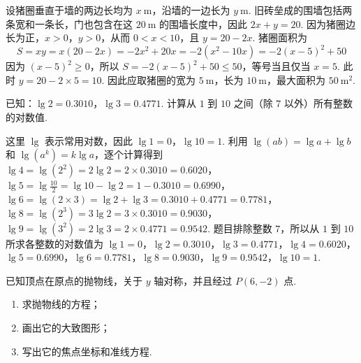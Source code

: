 \begin{solution}
设猪圈垂直于墙的两边长均为 \(x\mathrm{~m}\)，沿墙的一边长为 \(y\mathrm{~m}\). 旧砖垒成的围墙包括两条宽和一条长，门也包含在这 \(20\mathrm{~m}\) 的围墙长度中，因此
\(2x+y=20\). 因为猪圈边长为正，\(x>0\)，\(y>0\)，从而 \(0<x<10\)，且 \(y=20-2x\). 猪圈面积为
\[
S=xy=x(20-2x)=-2x^2+20x=-2\left(x^2-10x\right)
=-2\left(x-5\right)^2+50
\]
因为 \(\left(x-5\right)^2\geqslant0\)，所以 \(S=-2\left(x-5\right)^2+50\leq50\)，等号当且仅当 \(x=5\). 此时
\(y=20-2\times5=10\). 因此应取猪圈的宽为 \(5\mathrm{~m}\)，长为 \(10\mathrm{~m}\)，最大面积为 \(50\mathrm{~m}^2\).
\end{solution}

\begin{problem}
已知：\(\lg 2=0.3010\)，\(\lg 3=0.4771\). 计算从 \(1\) 到 \(10\) 之间（除 \(7\) 以外）所有整数的对数值.
\end{problem}

\begin{solution}
这里 \(\lg\) 表示常用对数，因此 \(\lg1=0\)，\(\lg10=1\). 利用 \(\lg(ab)=\lg a+\lg b\) 和 \(\lg(a^k)=k\lg a\)，逐个计算得到
\(\lg4=\lg\left(2^2\right)=2\lg2=2\times0.3010=0.6020\)，
\(\lg5=\lg\frac{10}{2}=\lg10-\lg2=1-0.3010=0.6990\)，
\(\lg6=\lg\left(2\times3\right)=\lg2+\lg3=0.3010+0.4771=0.7781\)，
\(\lg8=\lg\left(2^3\right)=3\lg2=3\times0.3010=0.9030\)，
\(\lg9=\lg\left(3^2\right)=2\lg3=2\times0.4771=0.9542\).
题目排除整数 \(7\)，所以从 \(1\) 到 \(10\) 所求各整数的对数值为
\(\lg1=0\)，\(\lg2=0.3010\)，\(\lg3=0.4771\)，\(\lg4=0.6020\)，\(\lg5=0.6990\)，\(\lg6=0.7781\)，\(\lg8=0.9030\)，\(\lg9=0.9542\)，\(\lg10=1\).
\end{solution}

\begin{problem}
已知顶点在原点的抛物线，关于 \(y\) 轴对称，并且经过 \(P(6,-2)\) 点.
\begin{enumerate}
\item 求抛物线的方程；
\item 画出它的大致图形；
\item 写出它的焦点坐标和准线方程.
\end{enumerate}
\end{problem}

